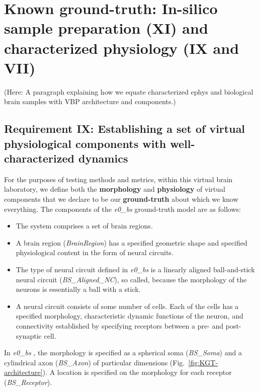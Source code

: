\documentclass{ldr-article}
\def\firstexp{\textit{e0\_bs} }
\begin{document}


\section{Known ground-truth: In-silico sample preparation (XI) and characterized physiology (IX and VII)}

(Here: A paragraph explaining how we equate characterized ephys and biological brain samples with VBP architecture and components.)


\subsection{Requirement IX: Establishing a set of virtual physiological components with well-characterized dynamics}

For the purposes of testing methods and metrics, within this virtual brain laboratory, we define both the \textbf{morphology} and \textbf{physiology} of virtual components that we declare to be our \textbf{ground-truth} about which we know everything. The components of the \firstexp ground-truth model are as follows:

\begin{itemize}
	\item The system comprises a set of brain regions.
	\item A brain region (\textit{BrainRegion}) has a specified geometric shape and specified physiological content in the form of neural circuits.
	\item The type of neural circuit defined in \firstexp is a linearly aligned ball-and-stick neural circuit (\textit{BS\_Aligned\_NC}), so called, because the morphology of the neurons is essentially a ball with a stick.
	\item A neural circuit consists of some number of cells. Each of the cells has a specified morphology, characteristic dynamic functions of the neuron, and connectivity established by specifying receptors between a pre- and post-synaptic cell.
\end{itemize}

In \firstexp, the morphology is specified as a spherical soma (\textit{BS\_Soma}) and a cylindrical axon (\textit{BS\_Axon}) of particular dimensions (Fig.~\ref{fig:KGT-architecture}). A location is specified on the morphology for each receptor (\textit{BS\_Receptor}).
\end{document}
